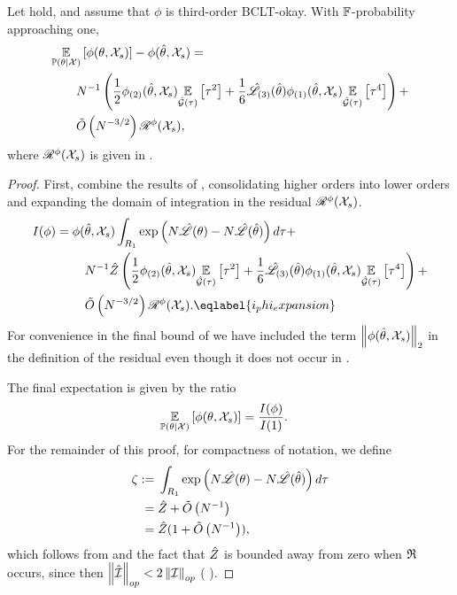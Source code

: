 %
\begin{lem}
%
Let  hold, and assume that $\phi$ is third-order BCLT-okay.
With $\mathbb{F}$-probability approaching one,
%
\begin{align*}
%
\MoveEqLeft
\expect{\post}{\phi(\theta, \xvec_s)} - \phi(\thetahat, \xvec_s) =
\\&
N^{-1} \left(
    \frac{1}{2} \phigrad{2}(\thetahat, \xvec_s) \expect{\normhat}{\tau^2} +
    \frac{1}{6} \likhatk{3}(\thetahat) \phigrad{1}(\thetahat, \xvec_s)
        \expect{\normhat}{\tau^4} \right) +
\\&
\ordlog{N^{-3/2}} \resid{\phi}(\xvec_s),
%
\end{align*}
%
where $\mathscr{R}^{\phi}({\mathcal{X}}_s)$ is given in .
%
\begin{proof}
%
First, combine the results of ,
consolidating higher orders into lower orders and expanding the domain of
integration in the residual $\mathscr{R}^{\phi}({\mathcal{X}}_s)$.
%
\begin{align}
%
I(\phi) ={}&
    \phi(\thetahat, \xvec_s)
    \int_{R_1} \exp\left(
        N \likhat(\theta) - N \likhat(\thetahat)
    \right) d\tau +
\nonumber\\ &\quad
    N^{-1} \normalizer \left(
        \frac{1}{2} \phigrad{2}(\thetahat, \xvec_s) \expect{\normhat}{\tau^2} +
        \frac{1}{6} \likhatk{3}(\thetahat) \phigrad{1}(\thetahat, \xvec_s)
            \expect{\normhat}{\tau^4} \right) +
\nonumber\\ &\quad
    \ordlog{N^{-3/2}} \resid{\phi}(\xvec_s).
\eqlabel{i_phi_expansion}
%
\end{align}
%
For convenience in the final bound of  we have included the
term $\left\Vert \phi(\hat\theta, {\mathcal{X}}_s)\right\Vert_2$ in the definition of the residual even
though it does not occur in .

The final expectation is given by the ratio
%
\begin{align*}
\underset{\mathbb{P}(\theta | {\mathcal{X}})}{\mathbb{E}}\left[\phi(\theta, {\mathcal{X}}_s)\right] ={}& \frac{I(\phi)}{I(1)}.
\end{align*}
%
For the remainder of this proof, for compactness of notation, we define
%
\begin{align*}
%
\zeta :={}&
    \int_{R_1} \exp\left(N \likhat(\theta) - N \likhat(\thetahat) \right) d\tau \\
={}& \normalizer + \ordlog{N^{-1}} \\
={}& \normalizer (1 + \ordlog{N^{-1}}),
%
\end{align*}
%
which follows from  and the fact that
$\hat{Z}$ is bounded away from zero when $\mathfrak{R}$ occurs, since then
$\left\Vert \hat{\mathcal{I}}\right\Vert_{op} < 2 \left\Vert \mathcal{I}\right\Vert_{op}$ (
).


\end{proof}
\end{lem}
